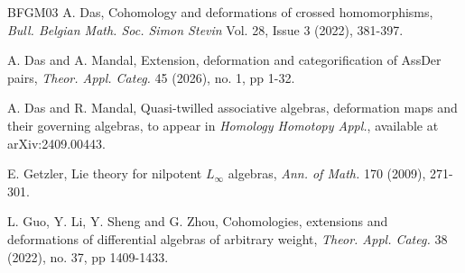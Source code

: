 \documentclass[a4paper,reqno,10pt]{amsart}
\theoremstyle{plain}
\theoremstyle{definition}
\theoremstyle{remark}
\begin{document}
\begin{thebibliography}{BFGM03}
   A. Das, Cohomology and deformations of crossed homomorphisms, {\em Bull. Belgian Math. Soc. Simon Stevin} Vol. 28, Issue 3 (2022), 381-397. 



  A. Das and A. Mandal, Extension, deformation and categorification of AssDer pairs, {\em Theor. Appl. Categ.} 45 (2026), no. 1, pp 1-32.

  A. Das and R. Mandal, Quasi-twilled associative algebras, deformation maps and their governing algebras, to appear in {\em Homology Homotopy Appl.}, available at arXiv:2409.00443.




    E. Getzler, Lie theory for nilpotent $L_\infty$ algebras, {\em Ann. of Math.} 170 (2009), 271-301.



   L. Guo, Y. Li, Y. Sheng and G. Zhou, Cohomologies, extensions and deformations of differential algebras of arbitrary weight, {\em Theor. Appl. Categ.} 38 (2022), no. 37, pp 1409-1433.




\end{thebibliography}
\end{document}
